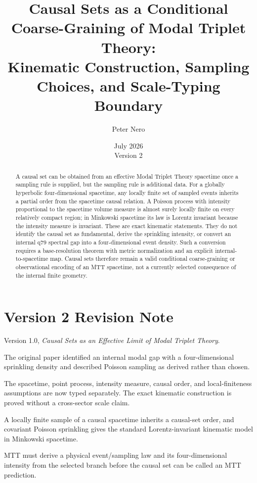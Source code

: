\documentclass[11pt]{article}
\title{Causal Sets as a Conditional Coarse-Graining of Modal Triplet Theory:\\
\large Kinematic Construction, Sampling Choices, and Scale-Typing Boundary}
\author{Peter Nero}
\date{July 2026\\Version 2}
\theoremstyle{definition}
\theoremstyle{remark}
\begin{document}
\maketitle

\begin{abstract}
A causal set can be obtained from an effective Modal Triplet Theory
spacetime once a sampling rule is supplied, but the sampling rule is
additional data. For a globally hyperbolic four-dimensional spacetime, any
locally finite set of sampled events inherits a partial order from the
spacetime causal relation. A Poisson process with intensity proportional to
the spacetime volume measure is almost surely locally finite on every
relatively compact region; in Minkowski spacetime its law is Lorentz
invariant because the intensity measure is invariant. These are exact
kinematic statements. They do not identify the causal set as fundamental,
derive the sprinkling intensity, or convert an internal q79 spectral gap
into a four-dimensional event density. Such a conversion requires a
base-resolution theorem with metric normalization and an explicit
internal-to-spacetime map. Causal sets therefore remain a valid conditional
coarse-graining or observational encoding of an MTT spacetime, not a
currently selected consequence of the internal finite geometry.
\end{abstract}

\section*{Version 2 Revision Note}
\begin{description}[leftmargin=3.2cm,style=nextline]
\item[Supersedes] Version 1.0, \emph{Causal Sets as an Effective Limit of
Modal Triplet Theory}.
\item[Reason] The original paper identified an internal modal gap with a
four-dimensional sprinkling density and described Poisson sampling as
derived rather than chosen.
\item[Resolution] The spacetime, point process, intensity measure, causal
order, and local-finiteness assumptions are now typed separately. The exact
kinematic construction is proved without a cross-sector scale claim.
\item[Retained result] A locally finite sample of a causal spacetime inherits
a causal-set order, and covariant Poisson sprinkling gives the standard
Lorentz-invariant kinematic model in Minkowski spacetime.
\item[Remaining boundary] MTT must derive a physical event/sampling law and
its four-dimensional intensity from the selected branch before the causal
set can be called an MTT prediction.
\end{description}
\end{document}
